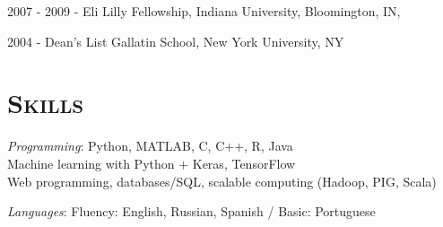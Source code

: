 \documentclass[margin,line,centered]{res}
\begin{document}
\begin{resume}
2007 - 2009 - Eli Lilly Fellowship, Indiana University, Bloomington, IN, 

2004 - Dean's List Gallatin School, New York University, NY


\section{\textsc{Skills}}



\hangindent=10pt \emph{Programming}: Python, MATLAB, C, C++, R, Java \\
Machine learning with Python + Keras, TensorFlow\\
Web programming, databases/SQL, scalable computing (Hadoop, PIG, Scala)

\emph{Languages}: Fluency: English, Russian, Spanish / Basic: Portuguese

\end{resume}
\end{document}
